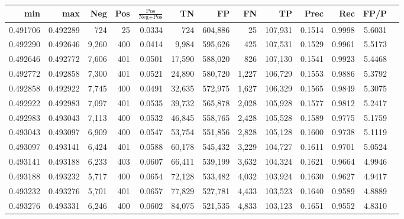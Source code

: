 \begin{tabular}{rrrrrrrrrrrrr}
\toprule
     min &      max &   Neg & Pos & $\frac{\text{Pos}}{\text{Neg}+\text{Pos}}$ &      TN &      FP &      FN &      TP &   Prec &    Rec &   FP/P \\
\midrule
0.491706 & 0.492289 &   724 &  25 &                                     0.0334 &     724 & 604,886 &      25 & 107,931 & 0.1514 & 0.9998 & 5.6031 \\
0.492290 & 0.492646 & 9,260 & 400 &                                     0.0414 &   9,984 & 595,626 &     425 & 107,531 & 0.1529 & 0.9961 & 5.5173 \\
0.492646 & 0.492772 & 7,606 & 401 &                                     0.0501 &  17,590 & 588,020 &     826 & 107,130 & 0.1541 & 0.9923 & 5.4468 \\
0.492772 & 0.492858 & 7,300 & 401 &                                     0.0521 &  24,890 & 580,720 &   1,227 & 106,729 & 0.1553 & 0.9886 & 5.3792 \\
0.492858 & 0.492922 & 7,745 & 400 &                                     0.0491 &  32,635 & 572,975 &   1,627 & 106,329 & 0.1565 & 0.9849 & 5.3075 \\
0.492922 & 0.492983 & 7,097 & 401 &                                     0.0535 &  39,732 & 565,878 &   2,028 & 105,928 & 0.1577 & 0.9812 & 5.2417 \\
0.492983 & 0.493043 & 7,113 & 400 &                                     0.0532 &  46,845 & 558,765 &   2,428 & 105,528 & 0.1589 & 0.9775 & 5.1759 \\
0.493043 & 0.493097 & 6,909 & 400 &                                     0.0547 &  53,754 & 551,856 &   2,828 & 105,128 & 0.1600 & 0.9738 & 5.1119 \\
0.493097 & 0.493141 & 6,424 & 401 &                                     0.0588 &  60,178 & 545,432 &   3,229 & 104,727 & 0.1611 & 0.9701 & 5.0524 \\
0.493141 & 0.493188 & 6,233 & 403 &                                     0.0607 &  66,411 & 539,199 &   3,632 & 104,324 & 0.1621 & 0.9664 & 4.9946 \\
0.493188 & 0.493232 & 5,717 & 400 &                                     0.0654 &  72,128 & 533,482 &   4,032 & 103,924 & 0.1630 & 0.9627 & 4.9417 \\
0.493232 & 0.493276 & 5,701 & 401 &                                     0.0657 &  77,829 & 527,781 &   4,433 & 103,523 & 0.1640 & 0.9589 & 4.8889 \\
0.493276 & 0.493331 & 6,246 & 400 &                                     0.0602 &  84,075 & 521,535 &   4,833 & 103,123 & 0.1651 & 0.9552 & 4.8310 \\

\end{tabular}
